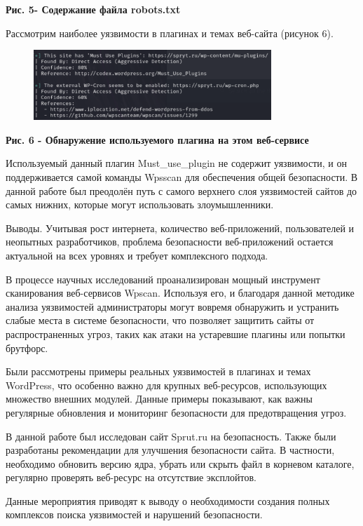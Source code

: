 {\bfseries Рис. 5- Содержание файла robots.txt}

Рассмотрим наиболее уязвимости в плагинах и темах веб-сайта (рисунок 6).

\begin{figure}[H]
	\centering
	\includegraphics[width=0.8\textwidth]{media/ict/image39}
	\caption*{}
\end{figure}


{\bfseries Рис. 6 - Обнаружение используемого плагина на этом веб-сервисе}

Используемый данный плагин Must\_use\_plugin не содержит уязвимости, и
он поддерживается самой команды Wpsscan для обеспечения общей
безопасности. В данной работе был преодолён путь с самого верхнего слоя
уязвимостей сайтов до самых нижних, которые могут использовать
злоумышленники.

Выводы. Учитывая рост интернета, количество веб-приложений,
пользователей и неопытных разработчиков, проблема безопасности
веб-приложений остается актуальной на всех уровнях и требует
комплексного подхода.

В процессе научных исследований проанализирован мощный инструмент
сканирования веб-сервисов Wpscan. Используя его, и благодаря данной
методике анализа уязвимостей администраторы могут вовремя обнаружить и
устранить слабые места в системе безопасности, что позволяет защитить
сайты от распространенных угроз, таких как атаки на устаревшие плагины
или попытки брутфорс.

Были рассмотрены примеры реальных уязвимостей в плагинах и темах
WordPress, что особенно важно для крупных веб-ресурсов, использующих
множество внешних модулей. Данные примеры показывают, как важны
регулярные обновления и мониторинг безопасности для предотвращения
угроз.

В данной работе был исследован сайт Sprut.ru на безопасность. Также были
разработаны рекомендации для улучшения безопасности сайта. В частности,
необходимо обновить версию ядра, убрать или скрыть файл в корневом
каталоге, регулярно проверять веб-ресурс на отсутствие эксплойтов.

Данные мероприятия приводят к выводу о необходимости создания полных
комплексов поиска уязвимостей и нарушений безопасности.

